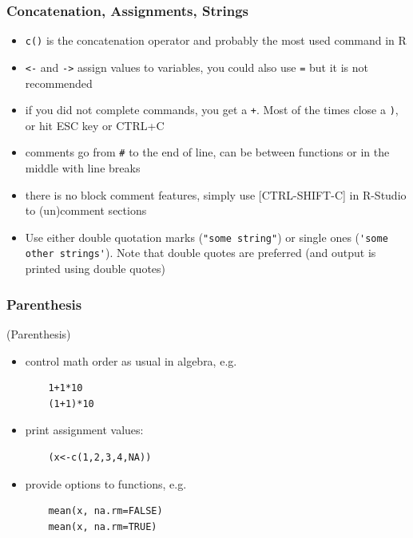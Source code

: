\documentclass[xcolor={svgnames},10pt,
handout
]{beamer}
\begin{document}
\begin{frame}[fragile]
\frametitle{Concatenation, Assignments, Strings}

\begin{itemize}
	\item \lstinline|c()| is the concatenation operator and probably the most used command in R
	\item \lstinline|<-| and \lstinline|->| assign values to variables, you could also use \lstinline|=| but it is not recommended
	\item if you did not complete commands, you get a \lstinline|+|. Most of the times close a \lstinline|)|, or hit ESC key or CTRL+C
	\item comments go from \lstinline|#| to the end of line, can be between functions or in the middle with line breaks
	\item there is no block comment features, simply use [CTRL-SHIFT-C] in R-Studio to (un)comment sections
	\item Use either double quotation marks (\lstinline|"some string"|) or single ones (\lstinline|'some other strings'|). Note that double quotes are preferred (and output is printed using double quotes)
\end{itemize}
\end{frame}

\begin{frame}[fragile]\frametitle{Parenthesis}
(Parenthesis)
\begin{itemize}
	\item control math order as usual in algebra, e.g.
	\begin{lstlisting}
	1+1*10
	(1+1)*10
	\end{lstlisting}
	\item print assignment values: 
	\begin{lstlisting}
	(x<-c(1,2,3,4,NA))
	\end{lstlisting}
	\item provide options to functions, e.g.
	\begin{lstlisting}
	mean(x, na.rm=FALSE)
	mean(x, na.rm=TRUE)
	\end{lstlisting}
\end{itemize}
\end{frame}
\end{document}
